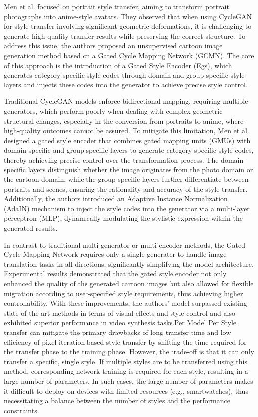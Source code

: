 Men et al.\citep{46Men_2022_CVPR} focused on portrait style transfer, aiming to transform portrait photographs into anime-style avatars. They observed that when using CycleGAN for style transfer involving significant geometric deformations, it is challenging to generate high-quality transfer results while preserving the correct structure. To address this issue, the authors proposed an unsupervised cartoon image generation method based on a Gated Cycle Mapping Network (GCMN). The core of this approach is the introduction of a Gated Style Encoder (Egs), which generates category-specific style codes through domain and group-specific style layers and injects these codes into the generator to achieve precise style control.

Traditional CycleGAN models enforce bidirectional mapping, requiring multiple generators, which perform poorly when dealing with complex geometric structural changes, especially in the conversion from portraits to anime, where high-quality outcomes cannot be assured. To mitigate this limitation, Men et al. designed a gated style encoder that combines gated mapping units (GMUs) with domain-specific and group-specific layers to generate category-specific style codes, thereby achieving precise control over the transformation process. The domain-specific layers distinguish whether the image originates from the photo domain or the cartoon domain, while the group-specific layers further differentiate between portraits and scenes, ensuring the rationality and accuracy of the style transfer. Additionally, the authors introduced an Adaptive Instance Normalization (AdaIN) mechanism to inject the style codes into the generator via a multi-layer perceptron (MLP), dynamically modulating the stylistic expression within the generated results.

In contrast to traditional multi-generator or multi-encoder methods, the Gated Cycle Mapping Network requires only a single generator to handle image translation tasks in all directions, significantly simplifying the model architecture. Experimental results demonstrated that the gated style encoder not only enhanced the quality of the generated cartoon images but also allowed for flexible migration according to user-specified style requirements, thus achieving higher controllability. With these improvements, the authors' model surpassed existing state-of-the-art methods in terms of visual effects and style control and also exhibited superior performance in video synthesis tasks.Per Model Per Style transfer can mitigate the primary drawbacks of long transfer time and low efficiency of pixel-iteration-based style transfer by shifting the time required for the transfer phase to the training phase. However, the trade-off is that it can only transfer a specific, single style. If multiple styles are to be transferred using this method, corresponding network training is required for each style, resulting in a large number of parameters. In such cases, the large number of parameters makes it difficult to deploy on devices with limited resources (e.g., smartwatches), thus necessitating a balance between the number of styles and the performance constraints.

